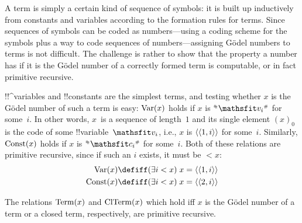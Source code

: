 \documentclass[../../../include/open-logic-section]{subfiles}
\begin{document}

\begin{explain}
A term is simply a certain kind of sequence of symbols: it is built up
inductively from constants and variables according to the formation
rules for terms.  Since sequences of symbols can be coded as
numbers---using a coding scheme for the symbols plus a way to code
sequences of numbers---assigning G\"odel numbers to terms is not
difficult.  The challenge is rather to show that the property a number
has if it is the G\"odel number of a correctly formed term is
computable, or in fact primitive recursive.
\end{explain}

!!^{variable}s and !!{constant}s are the simplest terms, and testing
whether $x$ is the G\"odel number of such a term is easy:
$\mathrm{Var}(x)$ holds if $x$ is $\Gn{\Obj v_i}$ for some~$i$. In other words,
$x$~is a sequence of length~$1$ and its single element $(x)_0$ is the
code of some !!{variable}~$\Obj v_i$, i.e., $x$ is $\langle \langle 1, i \rangle \rangle$ for
some~$i$. Similarly, $\mathrm{Const}(x)$ holds if $x$ is $\Gn{\Obj c_i}$ for
some~$i$. Both of these relations are primitive recursive, since if
such an $i$ exists, it must be $< x$:
\begin{align*}
  \fn{Var}(x) & \defiff \bexists{i<x}{x = \tuple{\tuple{1, i}}}\\
  \fn{Const}(x) & \defiff \bexists{i<x}{x = \tuple{\tuple{2, i}}}
\end{align*}

\begin{prop}
The relations $\mathrm{Term}(x)$ and $\mathrm{ClTerm}(x)$ which hold iff $x$
is the G\"odel number of a term or a closed term, respectively, are
primitive recursive.
\end{prop}
\end{document}

